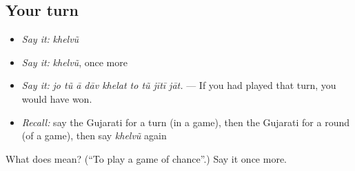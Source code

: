 \subsection*{Your turn}
\begin{itemize}
\raggedright
  \item \emph{Say it:} \emph{khelvũ}
  \item \emph{Say it:} \emph{khelvũ}, once more
  \item \emph{Say it:} \emph{jo tũ ā dāv khelat to tũ jītī jāt.} — If you had played that turn, you would have won.
  \item \emph{Recall:} say the Gujarati for a turn (in a game), then the Gujarati for a round (of a game), then say \emph{khelvũ} again
\end{itemize}

\begin{tcolorbox}[breakable,colback=teal!4,colframe=teal!35!black,title={Before you move on}]
What does  mean? (\textquotedblleft{}To play a game of chance\textquotedblright{}.) Say it once more.
\end{tcolorbox}
